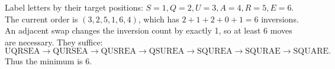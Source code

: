 Label letters by their target positions: $S=1,Q=2,U=3,A=4,R=5,E=6$. The current order is $(3,2,5,1,6,4)$, which has $2+1+2+0+1=6$ inversions. An adjacent swap changes the inversion count by exactly 1, so at least 6 moves are necessary. They suffice:\[\text{UQRSEA}\to\text{QURSEA}\to\text{QUSREA}\to\text{QSUREA}\to\text{SQUREA}\to\text{SQURAE}\to\text{SQUARE}.\]Thus the minimum is $\boxed 6$.
